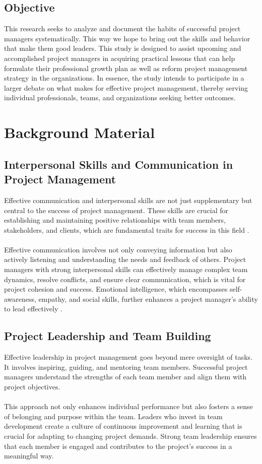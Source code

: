 \documentclass{article}
\begin{document}
\subsection{Objective}
This research seeks to analyze and document the habits of successful project managers systematically. This way we hope to bring out the skills and behavior that make them good leaders. This study is designed to assist upcoming and accomplished project managers in acquiring practical lessons that can help formulate their professional growth plan as well as reform project management strategy in the organizations. In essence, the study intends to participate in a larger debate on what makes for effective project management, thereby serving individual professionals, teams, and organizations seeking better outcomes.



\newpage
\section{Background Material}

\subsection{Interpersonal Skills and Communication in Project Management}
Effective communication and interpersonal skills are not just supplementary but central to the success of project management. These skills are crucial for establishing and maintaining positive relationships with team members, stakeholders, and clients, which are fundamental traits for success in this field \cite{Interpersonal_skills}.\\\\
Effective communication involves not only conveying information but also actively listening and understanding the needs and feedback of others. Project managers with strong interpersonal skills can effectively manage complex team dynamics, resolve conflicts, and ensure clear communication, which is vital for project cohesion and success. Emotional intelligence, which encompasses self-awareness, empathy, and social skills, further enhances a project manager's ability to lead effectively \cite{Warner_Mark}.\\

\subsection{Project Leadership and Team Building}
Effective leadership in project management goes beyond mere oversight of tasks. It involves inspiring, guiding, and mentoring team members. Successful project managers understand the strengths of each team member and align them with project objectives.\\
\\This approach not only enhances individual performance but also fosters a sense of belonging and purpose within the team. Leaders who invest in team development create a culture of continuous improvement and learning that is crucial for adapting to changing project demands. Strong team leadership ensures that each member is engaged and contributes to the project's success in a meaningful way\cite{Project_Management}.
\end{document}
